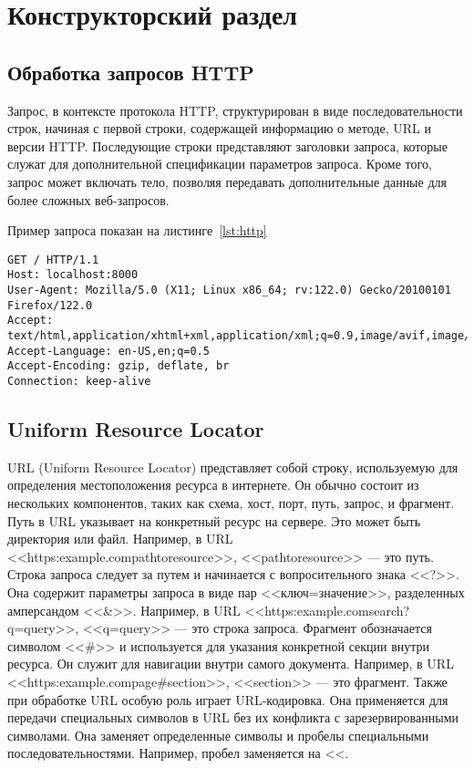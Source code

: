 \section{Конструкторский раздел}

\subsection{Обработка запросов HTTP}

Запрос, в контексте протокола HTTP, структурирован в виде последовательности строк, начиная с первой строки, содержащей информацию о методе, URL и версии HTTP. 
Последующие строки представляют заголовки запроса, которые служат для дополнительной спецификации параметров запроса. 
Кроме того, запрос может включать тело, позволяя передавать дополнительные данные для более сложных веб-запросов.

Пример запроса показан на листинге~\ref{lst:http}

\begin{center}
\captionsetup{justification=raggedright,singlelinecheck=off}
\begin{lstlisting}[label=lst:http,caption=HTTP запрос]
GET / HTTP/1.1
Host: localhost:8000
User-Agent: Mozilla/5.0 (X11; Linux x86_64; rv:122.0) Gecko/20100101 Firefox/122.0
Accept: text/html,application/xhtml+xml,application/xml;q=0.9,image/avif,image/webp,*/*;q=0.8
Accept-Language: en-US,en;q=0.5
Accept-Encoding: gzip, deflate, br
Connection: keep-alive
\end{lstlisting}
\end{center}
\clearpage

\subsection{Uniform Resource Locator}

URL (Uniform Resource Locator) представляет собой строку, используемую для определения местоположения ресурса в интернете. 
Он обычно состоит из нескольких компонентов, таких как схема, хост, порт, путь, запрос, и фрагмент.
Путь в URL указывает на конкретный ресурс на сервере. 
Это может быть директория или файл. 
Например, в URL <<https:\/\/example.com\/path\/to\/resource>>, <<\/path\/to\/resource>> --- это путь.
Строка запроса следует за путем и начинается с вопросительного знака <<?>>. 
Она содержит параметры запроса в виде пар <<ключ=значение>>, разделенных амперсандом <<\&>>. 
Например, в URL <<https:\/\/example.com\/search?q=query>>, <<q=query>> --- это строка запроса.
Фрагмент обозначается символом <<\#>> и используется для указания конкретной секции внутри ресурса. 
Он служит для навигации внутри самого документа.
Например, в URL <<https:\/\/example.com\/page\#section>>, <<section>> --- это фрагмент.
Также при обработке URL особую роль играет URL-кодировка. 
Она применяется для передачи специальных символов в URL без их конфликта с зарезервированными символами. 
Она заменяет определенные символы и пробелы специальными последовательностями. 
Например, пробел заменяется на <<.


